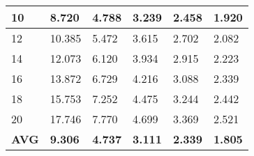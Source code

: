 \begin{table}[t!]
\begin{tabular}{|l|p{0.86cm}|p{0.86cm}|p{0.86cm}|p{0.86cm}|p{0.86cm}|}
		10               & 8.720                                                                    & 4.788                                                                    & 3.239                                                                     & 2.458                                                                     & 1.920                                                                     \\ \hline
		12               & 10.385                                                                   & 5.472                                                                    & 3.615                                                                     & 2.702                                                                     & 2.082                                                                     \\ \hline
		14               & 12.073                                                                   & 6.120                                                                    & 3.934                                                                     & 2.915                                                                     & 2.223                                                                     \\ \hline
		16               & 13.872                                                                   & 6.729                                                                    & 4.216                                                                     & 3.088                                                                     & 2.339                                                                     \\ \hline
		18               & 15.753                                                                   & 7.252                                                                    & 4.475                                                                     & 3.244                                                                     & 2.442                                                                     \\ \hline
		20               & 17.746                                                                   & 7.770                                                                    & 4.699                                                                     & 3.369                                                                     & 2.521                                                                     \\ \hline
		\textbf{AVG} & \textbf{9.306}                                                           & \textbf{4.737}                                                           & \textbf{3.111}                                                            & \textbf{2.339}                                                            & \textbf{1.805}                                                            \\ \hline
	\end{tabular}
	\label{tab:coverage}
\end{table}
